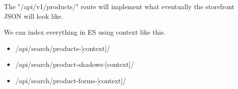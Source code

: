 \documentclass[11pt]{article}
\begin{document}
The "/api/v1/products/" route will implement what eventually the storefront JSON will look
like.

We can index everything in ES using context like this.

\begin{itemize}
    \item /api/search/products-[context]/
    \item /api/search/product-shadows-[context]/
    \item /api/search/product-forms-[context]/
\end{itemize}
\end{document}
